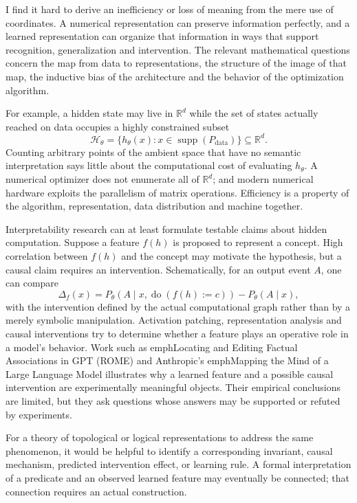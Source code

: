 I find it hard to derive an inefficiency or loss of meaning from the mere use of coordinates. A numerical representation can preserve information perfectly, and a learned representation can organize that information in ways that support recognition, generalization and intervention. The relevant mathematical questions concern the map from data to representations, the structure of the image of that map, the inductive bias of the architecture and the behavior of the optimization algorithm.

For example, a hidden state may live in \(\mathbb R^d\) while the set of states actually reached on data occupies a highly constrained subset
\[
 \mathcal H_\theta=\{h_\theta(x):x\in\operatorname{supp}(P_{\mathrm{data}})\}
 \subseteq\mathbb R^d.
\]
Counting arbitrary points of the ambient space that have no semantic interpretation says little about the computational cost of evaluating \(h_\theta\). A numerical optimizer does not enumerate all of \(\mathbb R^d\); and modern numerical hardware exploits the parallelism of matrix operations. Efficiency is a property of the algorithm, representation, data distribution and machine together.

Interpretability research can at least formulate testable claims about hidden computation. Suppose a feature \(f(h)\) is proposed to represent a concept. High correlation between \(f(h)\) and the concept may motivate the hypothesis, but a causal claim requires an intervention. Schematically, for an output event \(A\), one can compare
\[
 \Delta_f(x)
 =P_\theta(A\mid x,\operatorname{do}(f(h):=c))
  -P_\theta(A\mid x),
\]
with the intervention defined by the actual computational graph rather than by a merely symbolic manipulation. Activation patching, representation analysis and causal interventions try to determine whether a feature plays an operative role in a model's behavior. Work such as emph{Locating and Editing Factual Associations in GPT} (ROME) and Anthropic's emph{Mapping the Mind of a Large Language Model} illustrates why a learned feature and a possible causal intervention are experimentally meaningful objects. Their empirical conclusions are limited, but they ask questions whose answers may be supported or refuted by experiments.

For a theory of topological or logical representations to address the same phenomenon, it would be helpful to identify a corresponding invariant, causal mechanism, predicted intervention effect, or learning rule. A formal interpretation of a predicate and an observed learned feature may eventually be connected; that connection requires an actual construction.

